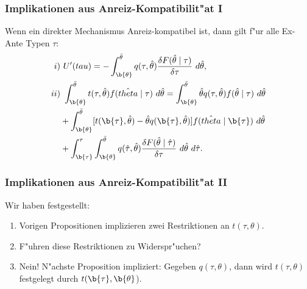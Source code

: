 \begin{frame}
  \frametitle{Implikationen aus Anreiz-Kompatibilit"at I}
  \justifying
  \begin{thmP}
    Wenn ein direkter Mechanismus Anreiz-kompatibel ist, dann gilt f"ur alle Ex-Ante Typen $\tau$:
    \begin{align*}
      i)& \ U'(tau) = - \int_{\b{\theta}}^{\bar{\theta}} q(\tau, \hat{\theta}) \dfrac{\delta F(\hat{\theta} \mid \tau)}{\delta \tau} \ d \hat{\theta}, \\
      ii)& \ \int_{\b{\theta}}^{\bar{\theta}} t( \tau, \hat{\theta}) f( \hat{theta} \mid \tau) \ d \hat{\theta} = \int_{\b{\theta}}^{\bar{\theta}} \hat{\theta} q(\tau, \hat{\theta})
      f(\hat{\theta} \mid \tau) \ d \hat{\theta} \\
      &+ \int_{\b{\theta}}^{\bar{\theta}} [t(\b{\tau}, \hat{\theta}) - \hat{\theta} q(\b{\tau}, \hat{\theta})] f( \hat{theta} \mid \b{\tau}) \ d \hat{\theta} \\
      &+ \int_{\b{\tau}}^{\tau} \int_{\b{\theta}}^{\bar{\theta}} q(\hat{\tau}, \hat{\theta}) \dfrac{\delta F(\hat{\theta} \mid \hat{\tau})}{\delta \tau} \ d \hat{\theta} \ d \hat{\tau}.
    \end{align*}
  \end{thmP}
\end{frame}

\begin{frame}
  \frametitle{Implikationen aus Anreiz-Kompatibilit"at II}
  \justifying
  Wir haben festgestellt:
  \begin{enumerate}
    \item Vorigen Propositionen implizieren zwei Restriktionen an $t(\tau, \theta)$.
    \item F"uhren diese Restriktionen zu Widerspr"uchen?
    \item Nein! N"achste Proposition impliziert: Gegeben $q(\tau, \theta)$, dann wird $t(\tau, \theta)$ festgelegt
    durch $t(\b{\tau}, \b{\theta}$).
  \end{enumerate}
\end{frame}

